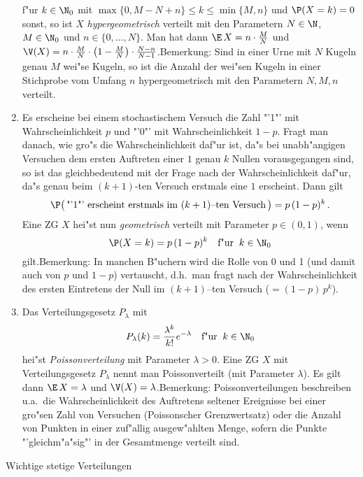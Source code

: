 \begin{enumerate}
f"ur $k\in\N_0$ mit $\max\{0,M-N+n\}\le k\le \min\{M,n\}$ und
$\P(X=k)=0$ sonst, so ist $X$ {\it hypergeometrisch} verteilt mit
den Parametern $N\in\N$, $M\in {\N}_0$ und $n\in\{0,\ldots,N\}$. Man
hat dann ${\E}\,X =n\cdot\frac{M}{N}$ und
$\V(X)=n\cdot\frac{M}{N}\cdot\left(1-\frac{M}{N}
\right)\cdot\frac{N-n}{N-1}$.\newline Bemerkung: Sind in einer Urne
mit $N$ Kugeln genau $M$ wei"se Kugeln, so ist die Anzahl der
wei"sen Kugeln in einer Stichprobe vom Umfang $n$ hypergeometrisch
mit den Parametern $N,M,n$ verteilt.
\item
Es erscheine bei einem stochastischem Versuch die Zahl "'1"' mit
Wahrscheinlichkeit $p$ und "'0"' mit Wahrscheinlichkeit $1-p$. Fragt
man danach, wie gro"s die Wahrscheinlichkeit daf"ur ist, da"s bei
unabh"angigen Versuchen dem ersten Auftreten einer $1$ genau $k$
Nullen vorausgegangen sind, so ist das gleichbedeutend mit der Frage
nach der Wahrscheinlichkeit daf"ur, da"s genau beim $(k+1)$-ten
Versuch erstmals eine $1$ erscheint. Dann gilt
\[\P\big(\,\mbox{"'1"' erscheint erstmals im $(k+1)$--ten Versuch}\,\big)
=p\, (1-p)^{k}\,.\] Eine ZG $X$ hei"st nun {\it geometrisch}
verteilt mit Parameter $p\in(0,1)$, wenn
\[\P(X=k)= p\,(1-p)^{k}\quad\mbox{f"ur}\;\;k\in\N_0\]
gilt.\newline Bemerkung: In manchen B"uchern wird die Rolle von 0
und 1 (und damit auch von $p$ und $1-p$) vertauscht, d.h.~man fragt
nach der Wahrscheinlichkeit des ersten Eintretens der Null im
$(k+1)$--ten Versuch ($=(1-p)\,p^{k}$).
\item
Das Verteilungsgesetz $P_\lambda$ mit
\[P_\lambda(k)=\frac{\lambda^k}{k!}e^{-\lambda}\quad
\mbox{f"ur} \;\;k\in{\N}_0\] hei"st {\it Poissonverteilung} mit
Parameter $\lambda>0$. Eine ZG $X$ mit Verteilungsgesetz $P_\lambda$
nennt man Poissonverteilt (mit Parameter $\lambda$). Es gilt dann
${\E}\,X=\lambda$ und $\V(X)=\lambda$.\newline Bemerkung:
Poissonverteilungen beschreiben u.a.~die Wahrscheinlichkeit des
Auftretens seltener Ereignisse bei einer gro"sen Zahl von Versuchen
(Poissonscher Grenzwertsatz) oder die Anzahl von Punkten in einer
zuf"allig ausgew"ahlten Menge, sofern die Punkte "'gleichm"a"sig"'
in der Gesamtmenge verteilt sind.
\end{enumerate}
\item
{\large Wichtige stetige Verteilungen}
